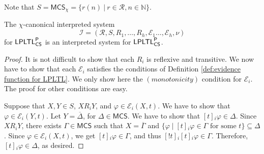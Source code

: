 \documentclass[envcountsect,envcountsame,oribibl,orivec]{llncs}
\newcommand{\LPLTLp}{\textsf{LPLTL}^{\sf P}}
\newcommand{\jbox}[1]{\left[#1\right]\!}
\newcommand{\CS}{\textsf{CS}}
\newcommand{\numberofagents}{h}
\newcommand{\agent}{i}
\newcommand{\runs}{\mathcal{R}}
\newcommand{\system}{\mathcal{I}}
\newcommand{\evidence}{\mathcal{E}}
\newcommand{\valuation}{\nu}
\newcommand{\N}{\mathbb{N}}
\renewcommand{\phi}{\varphi}
\newcommand{\MCS}{\mathsf{MCS}}
\begin{document}
Note that $S = \MCS_\chi = \{ r(n) \ |\ r\in \runs, n \in \N \}$. %


\begin{lemma}\label{lem: canonical interpreted model is a model}
	The $\chi$-canonical interpreted system 
	\[
	\system = (\runs, S, R_1,\ldots,R_\numberofagents, \evidence_1\ldots,\evidence_\numberofagents, \valuation)
	\] 
	for $\LPLTLp_\CS$ is an interpreted system for $\LPLTLp_\CS$.
\end{lemma}
\begin{proof}
	It is not difficult to show that each $R_\agent$ is reflexive and transitive. We now have to show that each $\evidence_\agent$ satisfies the conditions of Definition \ref{def:evidence function for LPLTL}. We only show here the $(monotonicity)$ condition for $\evidence_\agent$. The proof for other conditions are easy.
	
	Suppose that $X, Y \in S$, $X R_\agent Y$, and $\phi \in \evidence_\agent (X,t)$. We have to show that $\phi \in \evidence_\agent (Y,t)$. Let $Y = \overline{\Delta}$, for $\Delta \in \MCS$. We have to show that $\jbox{t}_\agent \phi \in \Delta$. Since $X R_\agent Y$, there exists $\Gamma \in \MCS$ such that $X = \overline{\Gamma}$ and  
	$\{ \phi \mid  \jbox{t}_\agent \phi \in \Gamma   \text{ for some $t$}\} \subseteq \Delta$. Since $\phi \in \evidence_\agent (X,t)$, we get $\jbox{t}_\agent \phi \in \Gamma$, and thus $\jbox{!t}_\agent \jbox{t}_\agent \phi \in \Gamma$. Therefore, $\jbox{t}_\agent \phi \in \Delta$, as desired.
\end{proof}
\end{document}
